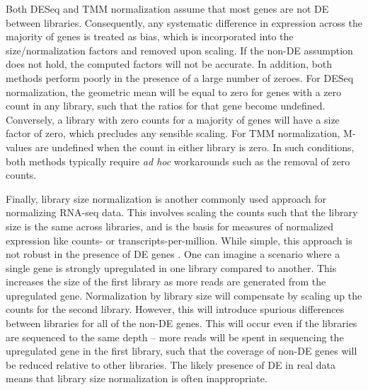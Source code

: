 \documentclass{bmcart}
\begin{document}
Both DESeq and TMM normalization assume that most genes are not DE between libraries.
Consequently, any systematic difference in expression across the majority of genes is treated as bias, which is incorporated into the size/normalization factors and removed upon scaling.
If the non-DE assumption does not hold, the computed factors will not be accurate.
In addition, both methods perform poorly in the presence of a large number of zeroes.
For DESeq normalization, the geometric mean will be equal to zero for genes with a zero count in any library, such that the ratios for that gene become undefined.
Conversely, a library with zero counts for a majority of genes will have a size factor of zero, which precludes any sensible scaling.
For TMM normalization, M-values are undefined when the count in either library is zero.
In such conditions, both methods typically require \textit{ad hoc} workarounds such as the removal of zero counts.

Finally, library size normalization is another commonly used approach for normalizing RNA-seq data.
This involves scaling the counts such that the library size is the same across libraries,
    and is the basis for measures of normalized expression like counts- or transcripts-per-million.
While simple, this approach is not robust in the presence of DE genes \cite{robinson2010scaling}.
One can imagine a scenario where a single gene is strongly upregulated in one library compared to another.
This increases the size of the first library as more reads are generated from the upregulated gene.
Normalization by library size will compensate by scaling up the counts for the second library.
However, this will introduce spurious differences between libraries for all of the non-DE genes.
This will occur even if the libraries are sequenced to the same depth 
    -- more reads will be spent in sequencing the upregulated gene in the first library, such that the coverage of non-DE genes will be reduced relative to other libraries.
The likely presence of DE in real data means that library size normalization is often inappropriate.
\end{document}
